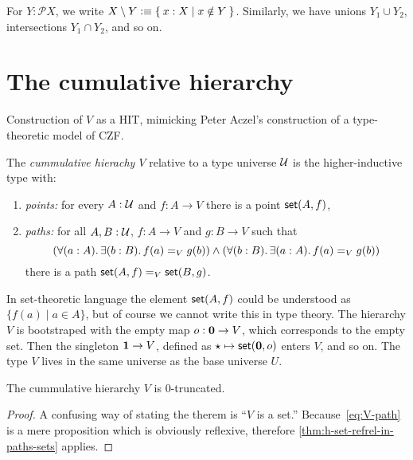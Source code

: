 For $Y:\mathcal{P}X$, we write $X\setminus Y \defeq \setof{x:X | x\notin Y}$.
Similarly, we have unions $Y_1 \cup Y_2$, intersections $Y_1 \cap Y_2$, and so on.

\section{The cumulative hierarchy}
\label{sec:cumulative-hierarchy}

Construction of $V$ as a HIT, mimicking Peter Aczel's construction of a type-theoretic
model of CZF.


\begin{defn}
  The \emph{cummulative hierachy $V$} relative to a type universe $\UU$ is the
  higher-inductive type with:
  \begin{enumerate}
  \item \emph{points:} for every $A : \UU$ and $f : A \to V$ there is a point $\vset(A, f)$,
  \item \emph{paths:} for all $A, B : \UU$, $f : A \to V$ and $g : B \to V$ such that
    \begin{equation} \label{eq:V-path}
      (\fall{a:A} \exis{b:B} \id[V]{f(a)}{g(b)}) \land (\fall{b:B} \exis{a:A} \id[V]{f(a)}{g(b)})
    \end{equation}
    there is a path $\id[V]{\vset(A,f)}{\vset(B,g)}$.
  \end{enumerate}
\end{defn}

\noindent
%
In set-theoretic language the element $\vset(A,f)$ could be understood as $\{ f(a) \mid a
\in A \}$, but of course we cannot write this in type theory. The hierarchy $V$ is
bootstraped with the empty map $o : \emptyt \to V$, which corresponds to the empty set.
Then the singleton $\unit \to V$, defined as $\ttt \mapsto \vset(\emptyt, o)$ enters $V$, and so
on. The type $V$ lives in the same universe as the base universe $U$.

\begin{thm} \label{V-is-set}
  The cummulative hierarchy $V$ is $0$-truncated.
\end{thm}

\begin{proof}
  A confusing way of stating the therem is ``$V$ is a set.'' Because~\eqref{eq:V-path} is
  a mere proposition which is obviously reflexive, therefore
  \autoref{thm:h-set-refrel-in-paths-sets} applies.
\end{proof}

